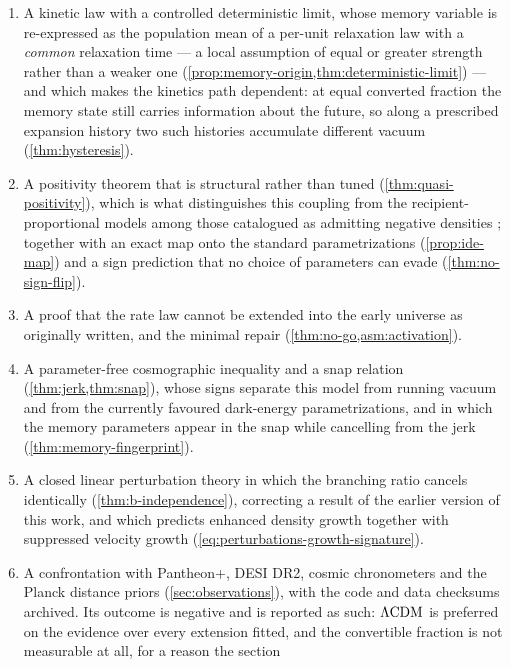 \begin{enumerate}
  \item A kinetic law with a controlled deterministic limit, whose memory
    variable is re-expressed as the population mean of a per-unit relaxation
    law with a \emph{common} relaxation time --- a local assumption of equal or
    greater strength rather than a weaker one
    (\cref{prop:memory-origin,thm:deterministic-limit}) --- and which
    makes the kinetics path dependent: at equal converted fraction the memory
    state still carries information about the future, so along a prescribed
    expansion history two such histories accumulate different vacuum
    (\cref{thm:hysteresis}).
  \item A positivity theorem that is structural rather than tuned
    (\cref{thm:quasi-positivity}), which is what distinguishes this coupling
    from the recipient-proportional models among those catalogued as admitting
    negative densities \parencite{westhuizen2025_250904495,westhuizen2025_250904494,westhuizen2025_250904496};
    together with an exact map onto the standard parametrizations
    (\cref{prop:ide-map}) and a sign prediction that no choice of parameters
    can evade (\cref{thm:no-sign-flip}).
  \item A proof that the rate law cannot be extended into the early universe as
    originally written, and the minimal repair (\cref{thm:no-go,asm:activation}).
  \item A parameter-free cosmographic inequality and a snap relation
    (\cref{thm:jerk,thm:snap}), whose signs separate this model from running
    vacuum and from the currently favoured dark-energy parametrizations, and in
    which the memory parameters appear in the snap while cancelling from the
    jerk (\cref{thm:memory-fingerprint}).
  \item A closed linear perturbation theory in which the branching ratio
    cancels identically (\cref{thm:b-independence}), correcting a result of the
    earlier version of this work, and which predicts enhanced density growth
    together with suppressed velocity growth
    (\cref{eq:perturbations-growth-signature}).
  \item A confrontation with Pantheon+, DESI DR2, cosmic chronometers and the
    Planck distance priors (\cref{sec:observations}), with the code and data
    checksums archived. Its outcome is negative and is reported as such:
    $\Lambda\mathrm{CDM}$ is preferred on the evidence over every extension fitted, and the
    convertible fraction is not measurable at all, for a reason the section

\end{enumerate}
